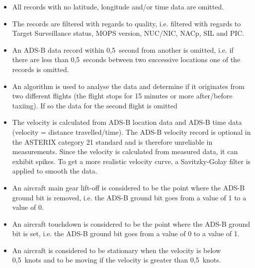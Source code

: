 \begin{itemize}
    \item All records with no latitude, longitude and/or time data are omitted.
    \item The records are filtered with regards to quality, i.e. filtered with regards to Target Surveillance status, MOPS version, NUC/NIC, NACp, SIL and PIC.
    \item An ADS-B data record within 0,5~second from another is omitted, i.e. if there are less than 0,5~seconds between two successive locations one of the records is omitted.
    \item An algorithm is used to analyse the data and determine if it originates from two different flights (the flight stops for 15 minutes or more after/before taxiing). If so the data for the second flight is omitted
    \item The velocity is calculated from ADS-B location data and ADS-B time data (velocity = distance travelled/time). The ADS-B velocity record is optional in the ASTERIX category 21 standard and is therefore unreliable in measurements. Since the velocity is calculated from measured data, it can exhibit spikes. To get a more realistic velocity curve, a Savitzky-Golay filter is applied to smooth the data.
    \item An aircraft main gear lift-off is considered to be the point where the ADS-B ground bit is removed, i.e. the ADS-B ground bit goes from a value of 1 to a value of 0.
    \item An aircraft touchdown is considered to be the point where the ADS-B ground bit is set, i.e. the ADS-B ground bit goes from a value of 0 to a value of 1.
    \item An aircraft is considered to be stationary when the velocity is below 0,5~knots and to be moving if the velocity is greater than 0,5~knots.
    
\end{itemize}


